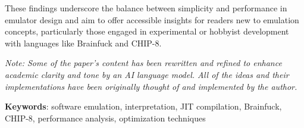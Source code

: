 \documentclass[12pt]{scrreport}
\begin{document}
\par These findings underscore the balance between simplicity and performance in emulator design and aim to offer accessible insights for readers new to emulation concepts, particularly those engaged in experimental or hobbyist development with languages like Brainfuck and CHIP-8.

\par \textit{Note: Some of the paper's content has been rewritten and refined to enhance academic clarity and tone by an AI language model. All of the ideas and their implementations have been originally thought of and implemented by the author.}

\par \textbf{Keywords}: software emulation, interpretation, JIT compilation, Brainfuck, CHIP-8, performance analysis, optimization techniques

\tableofcontents
\newpage
{}








\end{document}
